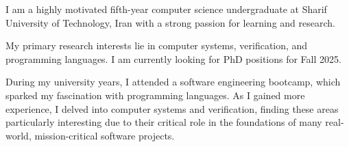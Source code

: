 

\begin{cvparagraph}

I am a highly motivated fifth-year computer science undergraduate at Sharif
University of Technology, Iran with a strong passion for learning and research.

My primary research interests lie in computer systems, verification, and programming languages. I am currently looking for PhD positions for Fall 2025.

During my university years, I attended a software engineering bootcamp, which sparked my fascination with programming languages. As I gained more experience, I delved into computer systems and verification, finding these areas particularly interesting due to their critical role in the foundations of many real-world, mission-critical software projects.

\end{cvparagraph}
